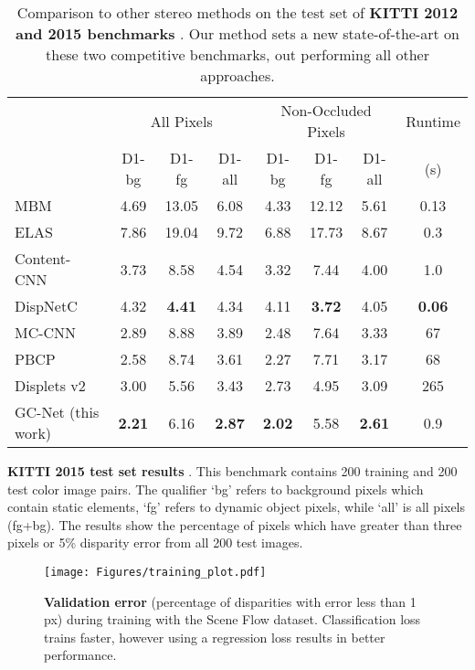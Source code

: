 \documentclass[10pt,twocolumn,letterpaper]{article}
\begin{document}
\begin{table*}[t]
\begin{subtable}[t]{\linewidth}
\centering
\begin{tabular}{l|ccc|ccc|c} \hline
                   & \multicolumn{3}{c|}{All Pixels} & \multicolumn{3}{c|}{Non-Occluded Pixels} & Runtime \\
                   & D1-bg   & D1-fg   & D1-all  & D1-bg   & D1-fg   & D1-all  & (s)     \\ \hline \hline
MBM \cite{einecke2015multi}			& 4.69 & 13.05 & 6.08 & 4.33 & 12.12 & 5.61 & 0.13 \\
ELAS \cite{geiger2010efficient} 	& 7.86 & 19.04 & 9.72 & 6.88 & 17.73 & 8.67 & 0.3 \\
Content-CNN \cite{luo2016efficient} & 3.73 & 8.58  & 4.54 & 3.32 & 7.44  & 4.00 & 1.0 \\
DispNetC \cite{Mayer2015} 			& 4.32 & \textbf{4.41}  & 4.34 & 4.11 & \textbf{3.72}  & 4.05 & \textbf{0.06}\\
MC-CNN \cite{zbontar2016stereo}     & 2.89 & 8.88  & 3.89 & 2.48 & 7.64  & 3.33 & 67  \\
PBCP \cite{Seki2016BMVC} 			& 2.58 & 8.74  & 3.61 & 2.27 & 7.71  & 3.17 & 68  \\
Displets v2 \cite{guney2015displets}& 3.00& 5.56  & 3.43 & 2.73 & 4.95  & 3.09 & 265 \\ \hline
GC-Net (this work)					& \textbf{2.21} & 6.16  & \textbf{2.87} & \textbf{2.02} & 5.58  & \textbf{2.61} & 0.9 \\      
\end{tabular}
	\caption{\textbf{KITTI 2015 test set results} \cite{Menze2015CVPR}. This benchmark contains 200 training and 200 test color image pairs. The qualifier `bg' refers to background pixels which contain static elements, `fg' refers to dynamic object pixels, while `all' is all pixels (fg+bg). The results show the percentage of pixels which have greater than three pixels or 5\% disparity error from all 200 test images.}
	\label{tbl:kitti2015}
\end{subtable}
	\caption{Comparison to other stereo methods on the test set of \textbf{KITTI 2012 and 2015 benchmarks} \cite{Geiger2012CVPR,Menze2015CVPR}. Our method sets a new state-of-the-art on these two competitive benchmarks, out performing all other approaches.}
	\label{tbl:kitti_test}
\end{table*}

\begin{figure}[t]
\centering
\texttt{[image: Figures/training\_plot.pdf]}
\caption{\textbf{Validation error} (percentage of disparities with error less than 1 px) during training with the Scene Flow dataset. Classification loss trains faster, however using a regression loss results in better performance.}
\label{fig:training_err}
\end{figure}
\end{document}
